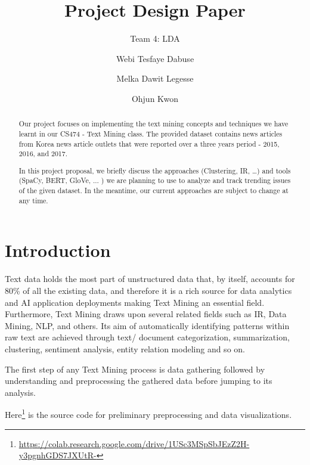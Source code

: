 \documentclass[sigconf,authorversion,nonacm]{acmart}
\begin{document}
\title{Project Design Paper}
\subtitle{Team 4: LDA}

\author{Webi Tesfaye Dabuse}

\author{Melka Dawit Legesse}

\author{Ohjun Kwon}

\begin{abstract}
    Our project focuses on implementing the text mining concepts and techniques we have learnt in our CS474 - Text Mining class. The provided dataset contains news articles from Korea news article outlets that were reported over a three years period - 2015, 2016, and 2017.

    In this project proposal, we briefly discuss the approaches (Clustering, IR, …) and tools (SpaCy, BERT, GloVe, ... ) we are planning to use to analyze and track trending issues of the given dataset.  In the meantime, our current approaches are subject to change at any time.
\end{abstract}

\maketitle

\section{Introduction}
Text data holds the most part of unstructured data that, by itself,  accounts for 80\% of all the existing data, and therefore it is a rich source for data analytics and AI application deployments making Text Mining an essential field. Furthermore, Text Mining draws upon several related fields such as IR, Data Mining, NLP, and others. Its aim of automatically identifying patterns within raw text are achieved through text/ document categorization, summarization, clustering, sentiment analysis, entity relation modeling and so on.

The first step of any Text Mining process is data gathering followed by understanding and preprocessing the gathered data before jumping to its analysis.

Here\footnote{\url{https://colab.research.google.com/drive/1USc3MSpSbJEzZ2H-y3pgnhGDS7JXUtR-}} is the source code for preliminary preprocessing and data visualizations.
\end{document}
